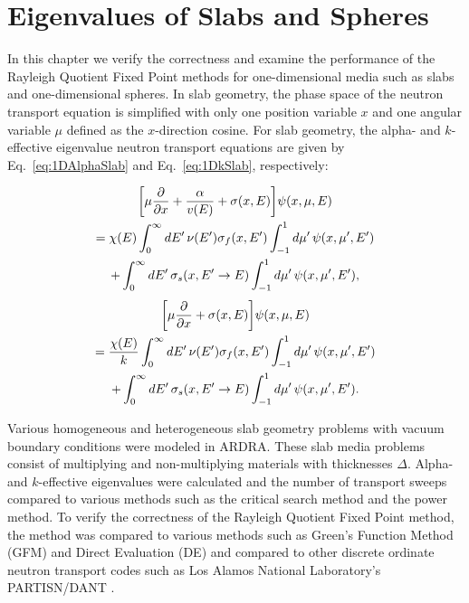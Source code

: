 \chapter{Eigenvalues of Slabs and Spheres}

In this chapter we verify the correctness and examine the performance of the Rayleigh Quotient Fixed Point methods for one-dimensional media such as slabs and one-dimensional spheres. In slab geometry, the phase space of the neutron transport equation is simplified with only one position variable $x$ and one angular variable $\mu$ defined as the $x$-direction cosine. For slab geometry, the alpha- and $k$-effective eigenvalue neutron transport equations are given by Eq.~\ref{eq:1DAlphaSlab} and Eq.~\ref{eq:1DkSlab}, respectively:

\begin{multline}
\bigg [ \mu \frac{\partial}{\partial x} + \frac{\alpha}{v(E)} + \sigma(x,E) \bigg ] \psi(x,\mu,E) \\ = \chi(E) \int_{0}^{\infty} \mathop{}\!d E' \, \nu(E') \sigma_{f}(x,E') \int_{-1}^{1} \mathop{}\!d \mu' \, \psi(x,\mu',E') \\ + \int_{0}^{\infty} \mathop{}\!d E' \, \sigma_{s}(x, E' \rightarrow E) \int_{-1}^{1} \mathop{}\!d \mu' \, \psi(x,\mu',E'),
\label{eq:1DAlphaSlab}
\end{multline}
\begin{multline}
\bigg [ \mu \frac{\partial}{\partial x}  + \sigma(x,E) \bigg ] \psi(x,\mu,E) \\ = \frac{\chi(E)}{k} \int_{0}^{\infty} \mathop{}\!d E' \, \nu(E') \sigma_{f}(x,E') \int_{-1}^{1} \mathop{}\!d \mu' \,\psi(x,\mu',E') \\ + \int_{0}^{\infty} \mathop{}\!d E' \, \sigma_{s}(x, E' \rightarrow E) \int_{-1}^{1} \mathop{}\!d \mu' \, \psi(x,\mu',E').
\label{eq:1DkSlab}
\end{multline}

Various homogeneous and heterogeneous slab geometry problems with vacuum boundary conditions were modeled in ARDRA. These slab media problems consist of multiplying and non-multiplying materials with thicknesses $\Delta$. Alpha- and $k$-effective eigenvalues were calculated and the number of transport sweeps compared to various methods such as the critical search method and the power method. To verify the correctness of the Rayleigh Quotient Fixed Point method, the method was compared to various methods such as Green's Function Method (GFM) and Direct Evaluation (DE) and compared to other discrete ordinate neutron transport codes such as Los Alamos National Laboratory's PARTISN/DANT \cite{alcouffe2005partisn}.

